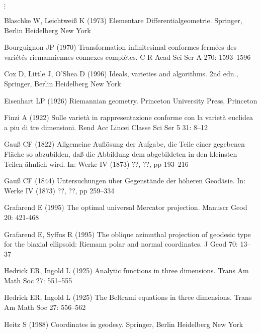 \documentclass[jog]{svjour}
\begin{document}
$\vdots$

\pagebreak

\begin{thebibliography}{}

 Blaschke W,
Leichtwei{\ss} K (1973) Elementare Differentialgeometrie. Springer,
Berlin Heidelberg New York

 Bourguignon JP (1970) Transformation
infinitesimal conformes ferm\'ees des vari\'et\'es riemanniennes
connexes compl\`etes. C R Acad Sci Ser A 270: 1593--1596

 Cox D, Little J, O'Shea D (1996)
Ideals, varieties and algorithms. 2nd edn., Springer, Berlin Heidelberg
New York

 Eisenhart LP (1926) Riemannian
geometry. Princeton University Press, Princeton

\bibitem[Finzi(1922)] Finzi A (1922) Sulle variet\`a in rappresentazione
conforme con la variet\`a euclidea a piu di tre dimensioni. Rend Acc
Lincei Classe Sci Ser 5 31: 8--12

 Gau{\ss} CF (1822) Allgemeine Aufl\"{o}sung
der Aufgabe, die Teile einer gegebenen Fl\"{a}che so abzubilden, da{\ss}
die Abbildung dem abgebildeten in den kleinsten Teilen \"{a}hnlich wird.
In: Werke IV (1873) ??, ??, pp 193--216

 Gau{\ss} CF (1844) Untersuchungen \"{u}ber
Gegenst\"{a}nde der h\"{o}heren Geod\"{a}sie. In: Werke IV (1873) ??, ??, pp
259--334

 Grafarend E (1995) The optimal
universal Mercator projection. Manuscr Geod 20: 421-468

 Grafarend E, Syffus R (1995) The
oblique azimuthal projection of geodesic type for the biaxial ellipsoid:
Riemann polar and normal coordinates. J Geod 70: 13--37

 Hedrick ER, Ingold L (1925)
Analytic functions in three dimensions. Trans Am Math Soc 27: 551--555

 Hedrick ER, Ingold L (1925)
The Beltrami equations in three dimensions. Trans Am Math Soc 27:
556--562

 Heitz S (1988) Coordinates in geodesy.
Springer, Berlin Heidelberg New York


\end{thebibliography}
\end{document}
